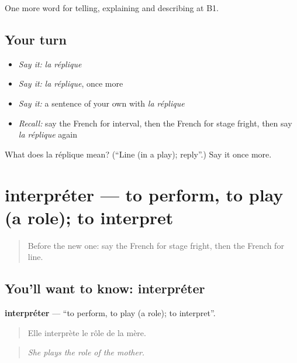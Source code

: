 \begin{grammarlens}[title={What you've built}]
One more word for telling, explaining and describing at B1.
\end{grammarlens}

\subsection*{Your turn}
\begin{itemize}
\raggedright
  \item \emph{Say it:} \emph{la réplique}
  \item \emph{Say it:} \emph{la réplique}, once more
  \item \emph{Say it:} a sentence of your own with \emph{la réplique}
  \item \emph{Recall:} say the French for interval, then the French for stage fright, then say \emph{la réplique} again
\end{itemize}

\begin{tcolorbox}[breakable,colback=teal!4,colframe=teal!35!black,title={Before you move on}]
What does la réplique mean? (\textquotedblleft{}Line (in a play); reply\textquotedblright{}.) Say it once more.
\end{tcolorbox}
\section[interpréter]{interpréter — to perform, to play (a role); to interpret}

\label{lesson:FR-C515-interpreter}



\begin{quote}
Before the new one: say the French for stage fright, then the French for line.
\end{quote}

\subsection*{You'll want to know: interpréter}
\textbf{interpréter} — \textquotedblleft{}to perform, to play (a role); to interpret\textquotedblright{}.

\begin{quote}
Elle interprète le rôle de la mère.
\end{quote}

\begin{quote}
\emph{She plays the role of the mother.}
\end{quote}

